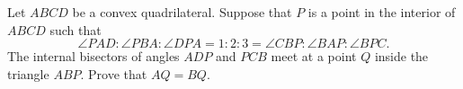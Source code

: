 Let $ABCD$ be a convex quadrilateral. Suppose that $P$ is a point in the interior of $ABCD$ such that
\[
\angle PAD : \angle PBA : \angle DPA = 1 : 2 : 3 = \angle CBP : \angle BAP : \angle BPC.
\]
The internal bisectors of angles $ADP$ and $PCB$ meet at a point $Q$ inside the triangle $ABP$. Prove that $AQ = BQ$.
